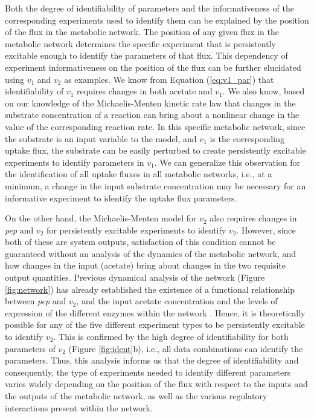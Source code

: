 \documentclass[10pt]{article}
\begin{document}
	Both the degree of identifiability of parameters and the informativeness of the corresponding experiments used to identify them can be explained by the position of the flux in the metabolic network. The position of any given flux in the metabolic network determines the specific experiment that is persistently excitable enough to identify the parameters of that flux. This dependency of experiment informativeness on the position of the flux can be further elucidated using $v_1$ and $v_2$ as examples. We know from Equation (\ref{eq:v1_par}) that identifiability of $v_1$ requires changes in both acetate and $v_1$. We also know, based on our knowledge of the Michaelis-Menten kinetic rate law that changes in the substrate concentration of a reaction can bring about a nonlinear change in the value of the corresponding reaction rate. In this specific metabolic network, since the substrate is an input variable to the model, and $v_1$ is the corresponding uptake flux, the substrate can be easily perturbed to create persistently excitable experiments to identify parameters in $v_1$. We can generalize this observation for the identification of all uptake fluxes in all metabolic networks, i.e., at a minimum, a change in the input substrate concentration may be necessary for an informative experiment to identify the uptake flux parameters. 
	
	On the other hand, the Michaelis-Menten model for $v_2$ also requires changes in \textit{pep} and $v_2$ for persistently excitable experiments to identify $v_2$. However, since both of these are system outputs, satisfaction of this condition cannot be guaranteed without an analysis of the dynamics of the metabolic network, and how changes in the input (acetate) bring about changes in the two requisite output quantities. Previous dynamical analysis of the network (Figure \ref{fig:network}) has already established the existence of a functional relationship between \textit{pep} and $v_2$, and the input acetate concentration and the levels of expression of the different enzymes within the network \parencite{Srinivasan2017}. Hence, it is theoretically possible for any of the five different experiment types to be persistently excitable to identify $v_2$. This is confirmed by the high degree of identifiability for both parameters of $v_2$ (Figure \ref{fig:ident}b), i.e., all data combinations can identify the parameters. Thus, this analysis informs us that the degree of identifiability and consequently, the type of experiments needed to identify different parameters varies widely depending on the position of the flux with respect to the inputs and the outputs of the metabolic network, as well as the various regulatory interactions present within the network. 
	
\end{document}
